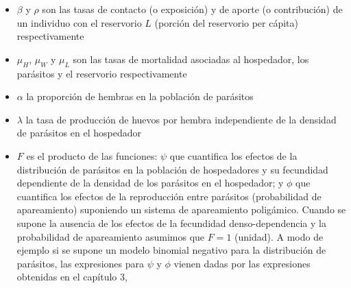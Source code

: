 \documentclass[12pt,a4paper]{article}
\theoremstyle{plain}%
\theoremstyle{definition}
\theoremstyle{remark}
\begin{document}
	\begin{itemize}
		\item $\beta$ y $\rho$ son las tasas de contacto (o exposición) y de aporte (o contribución) de un individuo con el reservorio $L$ (porción del reservorio per cápita) respectivamente
		\item $\mu_H$, $\mu_W$ y $\mu_L$ son las tasas de mortalidad asociadas al hospedador, los parásitos y el reservorio respectivamente
		\item $\alpha$ la proporción de hembras en la población de parásitos
		\item $\lambda$ la tasa de producción de huevos por hembra independiente de la densidad de parásitos en el hospedador
		\item $F$ %
		es el producto de las funciones: 
		$\psi$ que cuantifica los efectos de la distribución de parásitos en la población de hospedadores y su fecundidad dependiente de la densidad de los parásitos en el hospedador; 
		y $\phi$ que cuantifica los efectos de la reproducción entre parásitos (probabilidad de apareamiento)
		suponiendo un sistema de apareamiento poligámico. 
		Cuando se supone la ausencia de los efectos de la fecundidad denso-dependencia y la probabilidad de apareamiento asumimos que $F=1$ (unidad).
		A modo de ejemplo si se supone un modelo binomial negativo para la distribución de parásitos, las expresiones para $\psi$ y $\phi$ vienen 
		{%
		dadas por las expresiones obtenidas en el capítulo 3,%
		}

\end{itemize}
\end{document}
